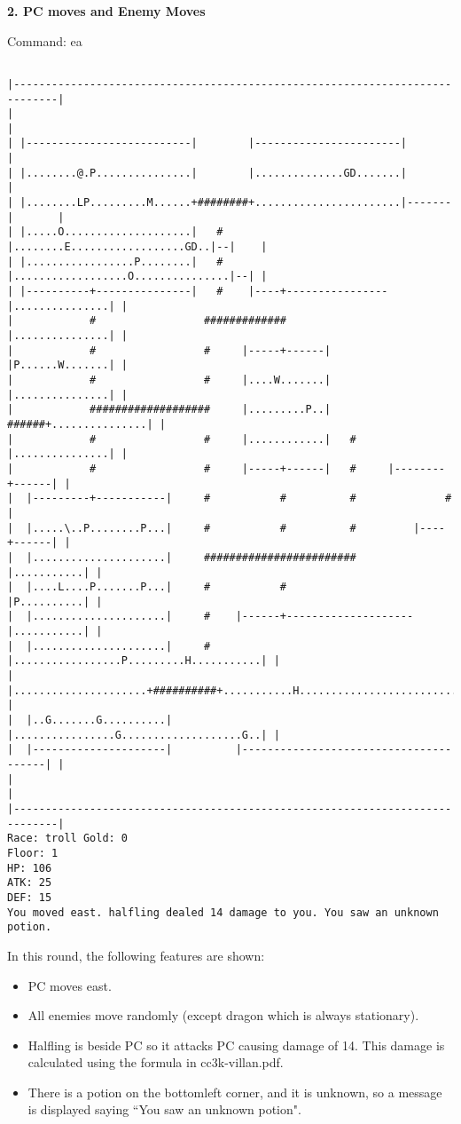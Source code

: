 \documentclass[11pt]{article}
\theoremstyle{plain}
\begin{document}
\newpage
\textbf{2. PC moves and Enemy Moves}

Command: ea
\begin{Verbatim}[fontsize=\small]

|-----------------------------------------------------------------------------|
|                                                                             |
| |--------------------------|        |-----------------------|               |
| |........@.P...............|        |..............GD.......|               |
| |........LP.........M......+########+.......................|-------|       |
| |.....O....................|   #    |........E..................GD..|--|    |
| |.................P........|   #    |..................O...............|--| |
| |----------+---------------|   #    |----+----------------|...............| |
|            #                 #############                |...............| |
|            #                 #     |-----+------|         |P......W.......| |
|            #                 #     |....W.......|         |...............| |
|            ###################     |.........P..|   ######+...............| |
|            #                 #     |............|   #     |...............| |
|            #                 #     |-----+------|   #     |--------+------| |
|  |---------+-----------|     #           #          #              #        |
|  |.....\..P........P...|     #           #          #         |----+------| |
|  |.....................|     ########################         |...........| |
|  |....L....P.......P...|     #           #                    |P..........| |
|  |.....................|     #    |------+--------------------|...........| |
|  |.....................|     #    |.................P.........H...........| |
|  |.....................+##########+...........H...........................| |
|  |..G.......G..........|          |................G...................G..| |
|  |---------------------|          |---------------------------------------| |
|                                                                             |
|-----------------------------------------------------------------------------|
Race: troll Gold: 0                                                    Floor: 1
HP: 106
ATK: 25
DEF: 15
You moved east. halfling dealed 14 damage to you. You saw an unknown potion. 
\end{Verbatim}

In this round, the following features are shown:
\begin{itemize}
	\item PC moves east.
	\item All enemies move randomly (except dragon which is always stationary).
	\item Halfling is beside PC so it attacks PC causing damage of 14.
		This damage is calculated using the formula in cc3k-villan.pdf.
	\item There is a potion on the bottomleft corner, and it is unknown, so a 
		message is displayed saying ``You saw an unknown potion". 
\end{itemize}
\end{document}
